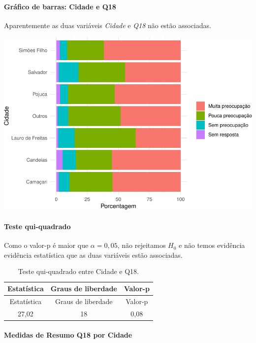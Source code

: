 \documentclass[]{article}
\let\oldparagraph\paragraph
\renewcommand{\paragraph}[1]{\oldparagraph{#1}\mbox{}}
\begin{document}
\hypertarget{gruxe1fico-de-barras-cidade-e-q18}{%
\paragraph{Gráfico de barras: Cidade e Q18}\label{gruxe1fico-de-barras-cidade-e-q18}}

Aparentemente as duas variáveis \emph{Cidade} e \emph{Q18} não estão associadas.

\begin{center}\includegraphics[width=0.75\linewidth]{relatorio_files/figure-latex/unnamed-chunk-220-1} \end{center}

\hypertarget{teste-qui-quadrado-23}{%
\paragraph{Teste qui-quadrado}\label{teste-qui-quadrado-23}}

Como o valor-p é maior que \(\alpha=0,05\), não rejeitamos \(H_0\) e não temos evidência evidência estatística que as duas variáveis estão associadas.

\begin{longtable}[]{@{}ccc@{}}
\caption{\label{tab:unnamed-chunk-221}Teste qui-quadrado entre Cidade e Q18.}\tabularnewline
\toprule
Estatística & Graus de liberdade & Valor-p\tabularnewline
\midrule
\endfirsthead
\toprule
Estatística & Graus de liberdade & Valor-p\tabularnewline
\midrule
\endhead
27,02 & 18 & 0,08\tabularnewline
\bottomrule
\end{longtable}

\cleardoublepage

\hypertarget{medidas-de-resumo-q18-por-cidade}{%
\paragraph{Medidas de Resumo Q18 por Cidade}\label{medidas-de-resumo-q18-por-cidade}}
\end{document}
